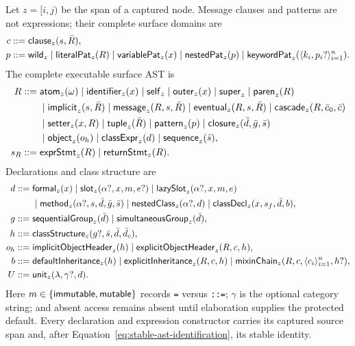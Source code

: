 Let $z=[i,j)$ be the span of a captured node.  Message clauses and patterns are
not expressions; their complete surface domains are
\begin{equation}\label{eq:surface-message-pattern-domain}
\begin{aligned}
 c&::=\mathsf{clause}_{z}(s,\bar R),\\
 p&::=\mathsf{wild}_{z}\mid\mathsf{literalPat}_{z}(R)
   \mid\mathsf{variablePat}_{z}(x)\mid\mathsf{nestedPat}_{z}(p)
   \mid\mathsf{keywordPat}_{z}(\langle k_i,p_i?\rangle_{i=1}^{n}).
\end{aligned}
\end{equation}
The complete executable surface AST is
\begin{equation}\label{eq:surface-expression-domain}
\begin{aligned}
 R::={}&\mathsf{atom}_{z}(\omega)\mid\mathsf{identifier}_{z}(x)
  \mid\mathsf{self}_{z}\mid\mathsf{outer}_{z}(x)\mid\mathsf{super}_{z}
  \mid\mathsf{paren}_{z}(R)\\
 &\mid\mathsf{implicit}_{z}(s,\bar R)
  \mid\mathsf{message}_{z}(R,s,\bar R)
  \mid\mathsf{eventual}_{z}(R,s,\bar R)
  \mid\mathsf{cascade}_{z}(R,\bar c_0,\bar c)\\
 &\mid\mathsf{setter}_{z}(x,R)\mid\mathsf{tuple}_{z}(\bar R)
  \mid\mathsf{pattern}_{z}(p)\mid\mathsf{closure}_{z}(\bar d,\bar g,\bar s)\\
 &\mid\mathsf{object}_{z}(o_h)\mid\mathsf{classExpr}_{z}(d)
  \mid\mathsf{sequence}_{z}(\bar s),\\
 s_R::={}&\mathsf{exprStmt}_{z}(R)\mid\mathsf{returnStmt}_{z}(R).
\end{aligned}
\end{equation}
Declarations and class structure are
\begin{equation}\label{eq:surface-declaration-domain}
\begin{aligned}
 d::={}&\mathsf{formal}_{z}(x)\mid
  \mathsf{slot}_{z}(\alpha?,x,m,e?)\mid
  \mathsf{lazySlot}_{z}(\alpha?,x,m,e)\\
 &\mid\mathsf{method}_{z}(\alpha?,s,\bar d,\bar g,\bar s)
  \mid\mathsf{nestedClass}_{z}(\alpha?,d)
  \mid\mathsf{classDecl}_{z}(x,s_f,\bar d,b),\\
 g::={}&\mathsf{sequentialGroup}_{z}(\bar d)\mid
         \mathsf{simultaneousGroup}_{z}(\bar d),\\
 h::={}&\mathsf{classStructure}_{z}(g?,\bar s,\bar d,\bar d_c),\\
 o_h::={}&\mathsf{implicitObjectHeader}_{z}(h)\mid
       \mathsf{explicitObjectHeader}_{z}(R,c,h),\\
 b::={}&\mathsf{defaultInheritance}_{z}(h)\mid
  \mathsf{explicitInheritance}_{z}(R,c,h)\mid
  \mathsf{mixinChain}_{z}(R,c,\langle c_i\rangle_{i=1}^{n},h?),\\
 U::={}&\mathsf{unit}_{z}(\lambda,\gamma?,d).
\end{aligned}
\end{equation}
Here $m\in\{\mathsf{immutable},\mathsf{mutable}\}$ records \texttt{=} versus
\texttt{::=}; $\gamma$ is the optional category string; and absent access
remains absent until elaboration supplies the protected default.  Every
declaration and expression constructor carries its captured source span and,
after Equation~\eqref{eq:stable-ast-identification}, its stable identity.

